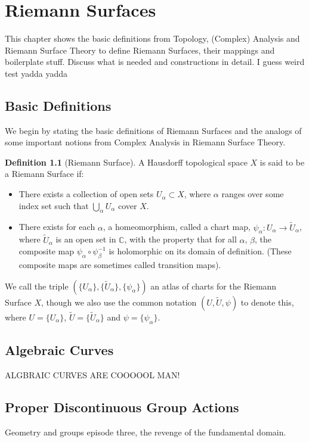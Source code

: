 \documentclass[a4paper,12pt]{report}
\theoremstyle{plain}
\theoremstyle{definition}
\newtheorem{defn}[thm]{Definition}
\begin{document}
\chapter{Riemann Surfaces}

This chapter shows the basic definitions from Topology, (Complex) Analysis 
and Riemann Surface Theory to define Riemann Surfaces, their mappings and 
boilerplate stuff. Discuss what is needed and constructions in detail.
I guess weird test yadda yadda 


\section{Basic Definitions}\label{bdefns}

We begin by stating the basic definitions of Riemann Surfaces and the 
analogs of some important notions from Complex Analysis in Riemann Surface
Theory.

\begin{defn}[Riemann Surface]\label{rsdefn}
A Hausdorff topological space $X$ is said to be a Riemann Surface if:
\begin{itemize}
\item There exists a collection of open sets $U_{\alpha} \subset X$, where
  $
\alpha$ 
ranges over some index set such that $\bigcup\limits_{\alpha} U_{\alpha}$
cover 
$X$.
\item There exists for each $\alpha$, a homeomorphism, called a chart map,
  $ \psi_{\alpha}\colon U_{\alpha} \rightarrow \tilde{U}_{\alpha}$, where
$\tilde{U}_{\alpha}$ is 
  an open set in $\mathbb{C}$, with the property that for all $\alpha$,
  $\beta$, the composite map $\psi_{\alpha} \circ \psi_{\beta}^{-1}$ is
  holomorphic on its 
domain of 
definition. (These composite maps are sometimes called transition maps).
\end{itemize}
We call the triple $(\{U_\alpha\},\{\tilde{U}_{\alpha}\},
\{\psi_\alpha\})$ an 
atlas of 
charts for the Riemann Surface $X$, though we also use the common
notation $(U,
\tilde{U}, \psi)$ to denote this, where $U=\{U_\alpha\}$,
$\tilde{U}=\{\tilde{U}
_{\alpha}\}$ and $\psi=\{\psi_\alpha\}$.
\end{defn}


\section{Algebraic Curves}\label{algcurv}
ALGBRAIC CURVES ARE COOOOOL MAN!

\section{Proper Discontinuous Group Actions}\label{PropDiscGrpAct}
Geometry and groups episode three, the revenge of the fundamental domain.
\end{document}
